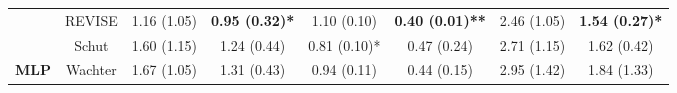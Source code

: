 \begin{table}
{\begin{tabular}[t]{>{}cccccccc}
 & REVISE & 1.16 (1.05) & \textbf{0.95 (0.32)*} & 1.10 (0.10) & \textbf{0.40 (0.01)**} & 2.46 (1.05) & \textbf{1.54 (0.27)*}\\

 & Schut & 1.60 (1.15) & 1.24 (0.44) & 0.81 (0.10)* & 0.47 (0.24) & 2.71 (1.15) & 1.62 (0.42)\\

\multirow{-6}{*}{\centering\arraybackslash \textbf{MLP}} & Wachter & 1.67 (1.05) & 1.31 (0.43) & 0.94 (0.11) & 0.44 (0.15) & 2.95 (1.42) & 1.84 (1.33)\\
\bottomrule
\end{tabular}}
\end{table}
